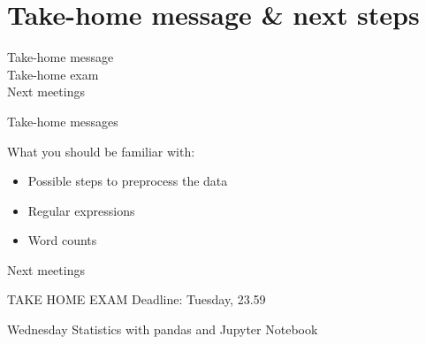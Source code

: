 \documentclass{beamer}
\begin{document}
\section{Take-home message \& next steps}
\begin{frame}
Take-home message\\
Take-home exam\\
Next meetings
\end{frame}


\begin{frame}{Take-home messages}
\begin{block}{What you should be familiar with:}
\begin{itemize}
\item Possible steps to preprocess the data
\item Regular expressions
\item Word counts
\end{itemize}
\end{block}
\end{frame}


\begin{frame}{Next meetings}
\begin{block}{TAKE HOME EXAM}
Deadline: Tuesday, 23.59
\end{block}

\begin{block}{Wednesday}
Statistics with pandas and Jupyter Notebook
\end{block}



\end{frame}
\end{document}
